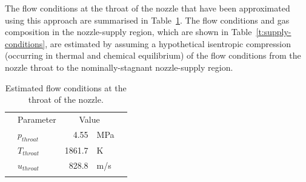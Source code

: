 \documentclass[12pt,a4paper]{article}
\begin{document}
%
The flow conditions at the throat of the nozzle that have been approximated 
using this approach are summarised in Table~\ref{t:throat-conditions}. The
flow conditions and gas composition in the nozzle-supply region, which are 
shown in Table~\ref{t:supply-conditions}, are estimated by assuming a 
hypothetical isentropic compression (occurring in thermal and chemical 
equilibrium) of the flow conditions from the nozzle throat to the 
nominally-stagnant nozzle-supply region.
%
\begin{table}[htbp]
 \begin{small}
  \begin{center}
  \caption{Estimated flow conditions at the throat of the nozzle.}
  \label{t:throat-conditions}
  \vspace{2mm}
  \begin{tabular}{@{}c@{}@{}l@{}@{}r@{}@{}l@{}@{}c@{}@{}}
  \hline\hline\noalign{\smallskip}
  \hspace{5mm}   &  Parameter \hspace{5mm}  &   \multicolumn{2}{c}{Value}  & \hspace{5mm}    \\
  \noalign{\smallskip}\hline\noalign{\smallskip}
  & $p_{throat}$    & 4.55    & \hspace{1mm} MPa   &  \\
  & $T_{throat}$    & 1861.7  & \hspace{1mm} K     &  \\
  & $u_{throat}$    & 828.8   & \hspace{1mm} m/s   &  \\
  \noalign{\smallskip}\hline\hline
  \end{tabular}
  \end{center}
 \end{small}
\end{table}
%
\end{document}
